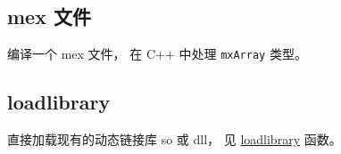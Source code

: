 
\begin{issues}
\issueDraft
\end{issues}

\subsection{mex 文件}
编译一个 mex 文件， 在 C++ 中处理 \verb|mxArray| 类型。 %

\subsection{loadlibrary}
直接加载现有的动态链接库 so 或 dll， 见 \href{https://www.mathworks.com/help/matlab/ref/loadlibrary.html}{loadlibrary} 函数。
